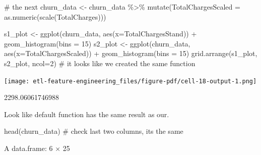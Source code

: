 \documentclass[
  letterpaper,
  DIV=11,
  numbers=noendperiod]{scrreprt}
\newenvironment{Shaded}{\begin{snugshade}}{\end{snugshade}}
\newcommand{\AttributeTok}[1]{\textcolor[rgb]{0.40,0.45,0.13}{#1}}
\newcommand{\CommentTok}[1]{\textcolor[rgb]{0.37,0.37,0.37}{#1}}
\newcommand{\DecValTok}[1]{\textcolor[rgb]{0.68,0.00,0.00}{#1}}
\newcommand{\FunctionTok}[1]{\textcolor[rgb]{0.28,0.35,0.67}{#1}}
\newcommand{\NormalTok}[1]{\textcolor[rgb]{0.00,0.23,0.31}{#1}}
\newcommand{\OtherTok}[1]{\textcolor[rgb]{0.00,0.23,0.31}{#1}}
\newcommand{\SpecialCharTok}[1]{\textcolor[rgb]{0.37,0.37,0.37}{#1}}
\begin{document}
\begin{Shaded}
\begin{Highlighting}[]
\CommentTok{\# the next }
\NormalTok{churn\_data }\OtherTok{\textless{}{-}}\NormalTok{ churn\_data }\SpecialCharTok{\%\textgreater{}\%}
        \FunctionTok{mutate}\NormalTok{(}\AttributeTok{TotalChargesScaled =} \FunctionTok{as.numeric}\NormalTok{(}\FunctionTok{scale}\NormalTok{(TotalCharges))) }

\NormalTok{s1\_plot }\OtherTok{\textless{}{-}} \FunctionTok{ggplot}\NormalTok{(churn\_data, }\FunctionTok{aes}\NormalTok{(}\AttributeTok{x=}\NormalTok{TotalChargesStand)) }\SpecialCharTok{+} \FunctionTok{geom\_histogram}\NormalTok{(}\AttributeTok{bins =} \DecValTok{15}\NormalTok{)}
\NormalTok{s2\_plot }\OtherTok{\textless{}{-}} \FunctionTok{ggplot}\NormalTok{(churn\_data, }\FunctionTok{aes}\NormalTok{(}\AttributeTok{x=}\NormalTok{TotalChargesScaled)) }\SpecialCharTok{+} \FunctionTok{geom\_histogram}\NormalTok{(}\AttributeTok{bins =} \DecValTok{15}\NormalTok{)}
\FunctionTok{grid.arrange}\NormalTok{(s1\_plot, s2\_plot, }\AttributeTok{ncol=}\DecValTok{2}\NormalTok{) }\CommentTok{\# it looks like we created the same function }
\end{Highlighting}
\end{Shaded}

\texttt{[image: etl-feature-engineering\_files/figure-pdf/cell-18-output-1.png]}

\begin{Shaded}
\end{Shaded}

2298.06061746988

Look like default function has the same result as our.

\begin{Shaded}
\begin{Highlighting}[]
\FunctionTok{head}\NormalTok{(churn\_data) }\CommentTok{\# check last two columns, its the same}
\end{Highlighting}
\end{Shaded}

A data.frame: 6 × 25
\end{document}
